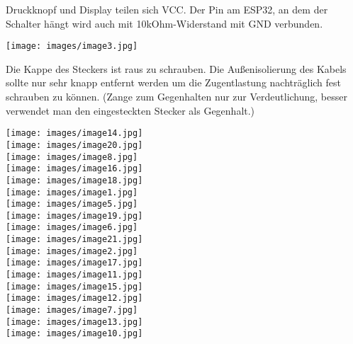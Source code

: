 \documentclass{scrartcl}
\begin{document}
Druckknopf und Display teilen sich VCC. Der Pin am ESP32, an dem der Schalter hängt wird auch mit 10kOhm-Widerstand mit GND verbunden.


\begin{center}
	\texttt{[image: images/image3.jpg]}
\end{center}

Die Kappe des Steckers ist raus zu schrauben. Die Außenisolierung des
Kabels sollte nur sehr knapp entfernt werden um die Zugentlastung
nachträglich fest schrauben zu können. (Zange zum Gegenhalten nur zur
Verdeutlichung, besser verwendet man den eingesteckten Stecker als
Gegenhalt.)


\texttt{[image: images/image14.jpg]}\\

\texttt{[image: images/image20.jpg]}\\

\texttt{[image: images/image8.jpg]}\\

\texttt{[image: images/image16.jpg]}\\

\texttt{[image: images/image18.jpg]}\\

\texttt{[image: images/image1.jpg]}\\

\texttt{[image: images/image5.jpg]}\\

\texttt{[image: images/image19.jpg]}\\

\texttt{[image: images/image6.jpg]}\\

\texttt{[image: images/image21.jpg]}\\

\texttt{[image: images/image2.jpg]}\\

\texttt{[image: images/image17.jpg]}\\

\texttt{[image: images/image11.jpg]}\\

\texttt{[image: images/image15.jpg]}\\

\texttt{[image: images/image12.jpg]}\\

\texttt{[image: images/image7.jpg]}\\

\texttt{[image: images/image13.jpg]}\\

\texttt{[image: images/image10.jpg]}\\
\end{document}
